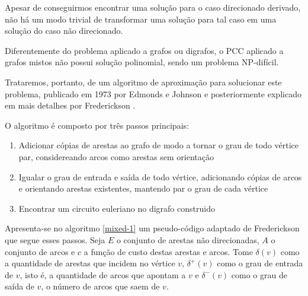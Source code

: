     Apesar de conseguirmos encontrar uma solução para o caso direcionado derivado, não há um modo trivial de transformar uma solução para tal caso em uma solução do caso não direcionado.

    Diferentemente do problema aplicado a grafos ou digrafos, o PCC aplicado a grafos mistos não possui solução polinomial, sendo um problema NP-difícil. 




    Trataremos, portanto, de um algoritmo de aproximação para solucionar este problema, publicado em 1973 por Edmonds e Johnson \cite{edmonds-johnson} e posteriormente explicado em mais detalhes por Frederickson \cite{frederickson}. 

    O algoritmo é composto por três passos principais:

    \begin{enumerate}
        \item Adicionar cópias de arestas ao grafo de modo a tornar o grau de todo vértice par, considereando arcos como arestas sem orientação
        \item Igualar o grau de entrada e saída de todo vértice, adicionando cópias de arcos e orientando arestas existentes, mantendo par o grau de cada vértice
        \item Encontrar um circuito euleriano no digrafo construido
    \end{enumerate}
    

    Apresenta-se no algoritmo \ref{mixed-1} um pseudo-código adaptado de Frederickson \cite{frederickson} que segue esses passos.
    Seja $E$ o conjunto de arestas não direcionadas, $A$ o conjunto de arcos e $c$ a função de custo destas arestas e arcos.
    Tome $\delta(v)$ como a quantidade de arestas que incidem no vértice $v$, $\delta^+(v)$ como o grau de entrada de $v$, isto é, a quantidade de arcos que apontam a $v$ e $\delta^-(v)$ como o grau de saída de $v$, o número de arcos que saem de $v$.

